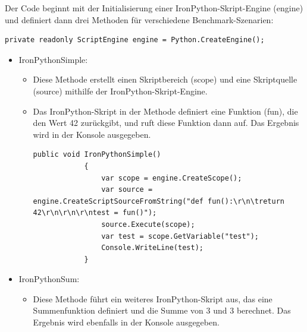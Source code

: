 Der Code beginnt mit der Initialisierung einer IronPython-Skript-Engine (engine) und definiert dann drei Methoden für verschiedene Benchmark-Szenarien:

\begin{lstlisting}[language={[Sharp]C}, caption=IronPythonCreateEnginge, label=lst:imp:ipyEngine]
    private readonly ScriptEngine engine = Python.CreateEngine();
\end{lstlisting}
    

\begin{itemize}
    \newpage
    \item IronPythonSimple:
    \begin{itemize}
        \item Diese Methode erstellt einen Skriptbereich (scope) und eine Skriptquelle (source) mithilfe der IronPython-Skript-Engine.
        \item Das IronPython-Skript in der Methode definiert eine Funktion (fun), die den Wert 42 zurückgibt, und ruft diese Funktion dann auf. Das Ergebnis wird in der Konsole ausgegeben.
        \begin{lstlisting}[language={[Sharp]C}, caption=IronPythonSimple, label=lst:imp:ipySimple]    
            public void IronPythonSimple()
            {
                var scope = engine.CreateScope();
                var source = engine.CreateScriptSourceFromString("def fun():\r\n\treturn 42\r\n\r\n\r\ntest = fun()");
                source.Execute(scope);
                var test = scope.GetVariable("test");
                Console.WriteLine(test);
            }
        \end{lstlisting}
    \end{itemize}
    \item IronPythonSum:
    \begin{itemize}
        \item  Diese Methode führt ein weiteres IronPython-Skript aus, das eine Summenfunktion definiert und die Summe von 3 und 3 berechnet. Das Ergebnis wird ebenfalls in der Konsole ausgegeben.
        \begin{lstlisting}[language={[Sharp]C}, caption=IronPythonSum, label=lst:imp:ipySum]


\end{lstlisting}
\end{itemize}
\end{itemize}

